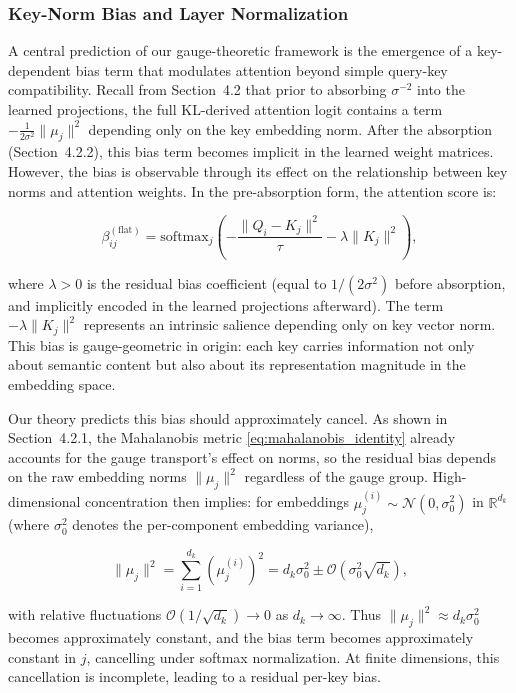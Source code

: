 \documentclass[twoside,11pt]{article}
\begin{document}
\subsubsection{Key-Norm Bias and Layer Normalization}

A central prediction of our gauge-theoretic framework is the emergence of a key-dependent bias term that modulates attention beyond simple query-key compatibility. Recall from Section~4.2 that prior to absorbing $\sigma^{-2}$ into the learned projections, the full KL-derived attention logit contains a term $-\frac{1}{2\sigma^2}\|\mu_j\|^2$ depending only on the key embedding norm. After the absorption (Section~4.2.2), this bias term becomes implicit in the learned weight matrices. However, the bias is observable through its effect on the relationship between key norms and attention weights. In the pre-absorption form, the attention score is:

\begin{equation}
\beta_{ij}^{(\text{flat})} = \text{softmax}_j\left( -\frac{\|Q_i - K_j\|^2}{\tau} - \lambda\|K_j\|^2 \right),
\end{equation}

where $\lambda > 0$ is the residual bias coefficient (equal to $1/(2\sigma^2)$ before absorption, and implicitly encoded in the learned projections afterward). The term $-\lambda\|K_j\|^2$ represents an intrinsic salience depending only on key vector norm. This bias is gauge-geometric in origin: each key carries information not only about semantic content but also about its representation magnitude in the embedding space.

Our theory predicts this bias should approximately cancel. As shown in Section~4.2.1, the Mahalanobis metric \eqref{eq:mahalanobis_identity} already accounts for the gauge transport's effect on norms, so the residual bias depends on the raw embedding norms $\|\mu_j\|^2$ regardless of the gauge group. High-dimensional concentration then implies: for embeddings $\mu_j^{(i)} \sim \mathcal{N}(0, \sigma_0^2)$ in $\mathbb{R}^{d_k}$ (where $\sigma_0^2$ denotes the per-component embedding variance),

\begin{equation}
\|\mu_j\|^2 = \sum_{i=1}^{d_k} (\mu_j^{(i)})^2 = d_k\sigma_0^2 \pm \mathcal{O}(\sigma_0^2\sqrt{d_k}),
\end{equation}

with relative fluctuations $\mathcal{O}(1/\sqrt{d_k}) \to 0$ as $d_k \to \infty$. Thus $\|\mu_j\|^2 \approx d_k\sigma_0^2$ becomes approximately constant, and the bias term becomes approximately constant in $j$, cancelling under softmax normalization. At finite dimensions, this cancellation is incomplete, leading to a residual per-key bias.
\end{document}
